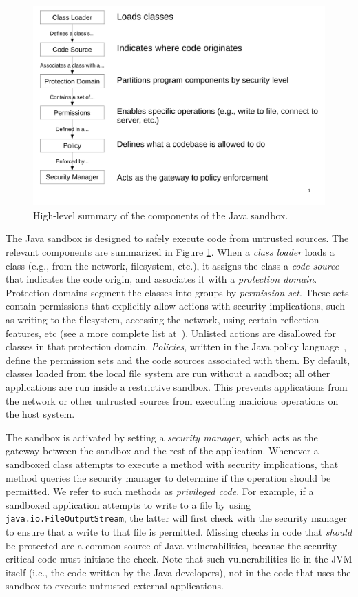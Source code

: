 \documentclass{sig-alternate}
\begin{document}
\begin{figure}
\includegraphics[width=\columnwidth]{sandbox_overview}
\caption{High-level summary of the components of the Java 
\label{fig:Sandbox-high-level-summary}
sandbox.}
\end{figure}

The Java sandbox is designed to safely execute code from untrusted
sources. 
The relevant components are summarized in Figure
\ref{fig:Sandbox-high-level-summary}. 
When a \textit{class loader} loads a class (e.g., from
the network, filesystem, etc.), it assigns the class a \textit{code source} that
indicates the code origin, and associates it with a \textit{protection
  domain}. Protection domains segment the classes into groups by
\textit{permission set}. These sets
contain permissions that explicitly allow actions with security
implications, such as writing to the filesystem, accessing the network, using
certain reflection features, etc (see a more complete list
at~\cite{_permissions_2014}).  Unlisted actions are disallowed for classes in
that protection domain.  \emph{Policies}, written in the Java policy
language~\cite{_java_policy_language}, define the permission sets and the code
sources associated with them. 
By default, classes loaded from the local file system are run
without a sandbox; all other applications are run inside a restrictive
sandbox.  This prevents applications from the network or other untrusted sources
from executing malicious operations on the host system.

The sandbox is activated by setting a \emph{security manager}, which acts as the
gateway between the sandbox and the rest of the application. Whenever a
sandboxed class attempts to execute a method with security implications, that
method queries the security manager to determine if the operation should be
permitted.  We refer to such methods as \emph{privileged code}.  For example, if
a sandboxed application attempts to write to a file by using
\texttt{java.io.FileOutputStream}, the latter will first
check with the security manager to ensure that a write to that file is
permitted.  Missing checks in code that \emph{should} be protected are a common
source of Java vulnerabilities, because the security-critical code must initiate
the check.  Note that such vulnerabilities lie in the JVM itself (i.e., the code
written by the Java developers), not in the code that uses the sandbox to
execute untrusted external applications.
\end{document}
